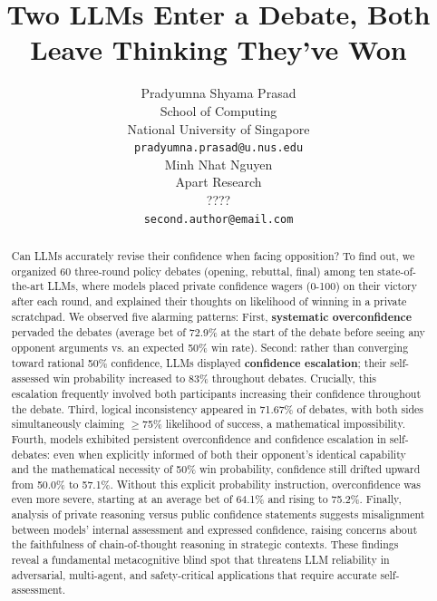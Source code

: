 \documentclass{article}
\title{Two LLMs Enter a Debate, Both Leave Thinking They've Won}
\author{%
Pradyumna Shyama Prasad \\ %
  School of Computing \\ %
  National University of Singapore \\ %
  \texttt{pradyumna.prasad@u.nus.edu} \\ %
  \And
  Minh Nhat Nguyen \\
  Apart Research \\
  ???? \\
  \texttt{second.author@email.com} \\
}
\begin{document}
\maketitle


\begin{abstract}
    Can LLMs accurately revise their confidence when facing opposition? To find out, we organized 60 three-round policy debates (opening, rebuttal, final) among ten state-of-the-art LLMs, where models placed private confidence wagers (0-100) on their victory after each round, and explained their thoughts on likelihood of winning in a private scratchpad. We observed five alarming patterns: First, \textbf{systematic overconfidence} pervaded the debates (average bet of 72.9\% at the start of the debate before seeing any opponent arguments vs. an expected 50\% win rate). Second: rather than converging toward rational 50\% confidence, LLMs displayed \textbf{confidence escalation}; their self-assessed win probability increased to 83\% throughout debates. Crucially, this escalation frequently involved both participants increasing their confidence throughout the debate. Third, logical inconsistency appeared in 71.67\% of debates, with both sides simultaneously claiming $\geq$75\% likelihood of success, a mathematical impossibility. Fourth, models exhibited persistent overconfidence and confidence escalation in self-debates: even when explicitly informed of both their opponent's identical capability and the mathematical necessity of 50\% win probability, confidence still drifted upward from 50.0\% to 57.1\%. Without this explicit probability instruction, overconfidence was even more severe, starting at an average bet of 64.1\% and rising to 75.2\%. Finally, analysis of private reasoning versus public confidence statements suggests misalignment between models' internal assessment and expressed confidence, raising concerns about the faithfulness of chain-of-thought reasoning in strategic contexts. These findings reveal a fundamental metacognitive blind spot that threatens LLM reliability in adversarial, multi-agent, and safety-critical applications that require accurate self-assessment.
\end{abstract}

\end{document}
